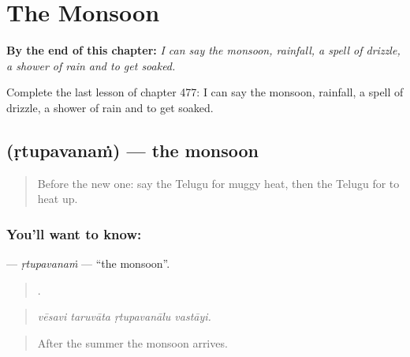 
\chapter{The Monsoon}
\label{ch:te-the-monsoon}

\begin{chapteropening}
\textbf{By the end of this chapter:} \emph{I can say the monsoon, rainfall, a spell of drizzle, a shower of rain and to get soaked.}

Complete the last lesson of chapter 477: I can say the monsoon, rainfall, a spell of drizzle, a shower of rain and to get soaked.
\end{chapteropening}

\section[\texorpdfstring{\te{ఋతుపవనం} (ṛtupavanaṁ)}{ఋతుపవనం (ṛtupavanaṁ)}]{ (ṛtupavanaṁ) — the monsoon}

\label{lesson:TE-C477-rtupavanam}



\begin{quote}
Before the new one: say the Telugu for muggy heat, then the Telugu for to heat up.
\end{quote}

\subsection*{You'll want to know: }
\textbf{} — \emph{ṛtupavanaṁ} — \textquotedblleft{}the monsoon\textquotedblright{}.

\begin{quote}
   .
\end{quote}

\begin{quote}
\emph{vēsavi taruvāta ṛtupavanālu vastāyi.}
\end{quote}

\begin{quote}
After the summer the monsoon arrives.
\end{quote}

